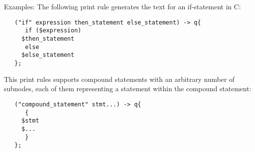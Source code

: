 \begin{grammar}
      \produces \lextoken{\$}  \\
      \produces \lextoken{\$}
	 \lextoken{\{}  \lextoken{\}} \\
      \produces {}
\end{grammar}

\noindent
Examples: The following print rule generates the text for an
if-statement in C:

\begin{lstlisting}
   ("if" expression then_statement else_statement) -> q{
      if ($expression)
	 $then_statement
      else
	 $else_statement
   };
\end{lstlisting}

\noindent
This print rules supports compound statements with an arbitrary
number of subnodes, each of them representing a statement within
the compound statement:

\begin{lstlisting}
   ("compound_statement" stmt...) -> q{
      {
	 $stmt
	 $...
      }
   };
\end{lstlisting}

\endinput
